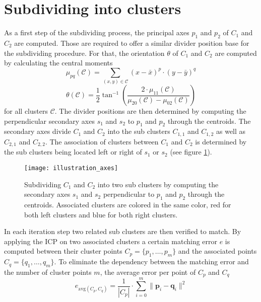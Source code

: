 \section{Subdividing into clusters}
\label{Subdividing}
As a first step of the subdividing process, the principal axes $p_{1}$ and $p_{2}$ of $C_1$ and $C_2$ are computed. Those are required to offer a similar divider position base for the subdividing procedure. For that, the orientation $\theta$ of $C_1$ and $C_2$ are computed by calculating the central moments
\begin{equation}
\mu_{pq}(\mathcal{C}) = \sum_{(x,y)\in\mathcal{C}} (x - \bar{x})^p \cdot (y - \bar{y})^q
\end{equation}
\begin{equation}
\theta(\mathcal{C}) = \frac{1}{2} \tan^{-1} \left(\frac{2\cdot \mu_{11}(\mathcal{C})}{\mu_{20}(\mathcal{C}) - \mu_{02}(\mathcal{C})}\right)
\end{equation}
for all clusters $\mathcal{C}$. The divider positions are then determined by computing the perpendicular secondary axes $s_{1}$ and $s_{2}$ to $p_{1}$ and $p_2$ through the centroids. The secondary axes divide $C_1$ and $C_2$ into the sub clusters $C_{1,1}$ and $C_{1,2}$ as well as $C_{2,1}$ and $C_{2,2}$. The association of clusters between $C_1$ and $C_2$ is determined by the sub clusters being located left or right of $s_1$ or $s_2$ (see figure \ref{fig:dc_axes_2p}). 
\begin{figure}[H]
	\centering
	\texttt{[image: illustration\_axes]}
	\caption{Subdividing $C_1$ and $C_2$ into two sub clusters by computing the secondary axes $s_1$ and $s_2$ perpendicular to $p_1$ and $p_2$ through the centroids. Associated clusters are colored in the same color, red for both left clusters and blue for both right clusters.}
	\label{fig:dc_axes_2p}
\end{figure}
In each iteration step two related sub clusters are then verified to match. By applying the ICP on two associated clusters a certain matching error $e$ is computed between their cluster points $ C_p =  \{ p_1, \ldots, p_m\}$ and the associated points $ C_q =  \{ q_1, \ldots, q_m\}$. To eliminate the dependency between the matching error and the number of cluster points $m$, the average error per point of $C_p$ and $C_q$
\begin{equation}
e_{\mathrm{avg}(C_p, C_q)} = \frac{1}{| C_p |} \cdot \displaystyle\sum_{i=0}^{m}\| \boldsymbol{p}_i - \boldsymbol{q}_i\|^2
\end{equation}
